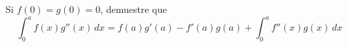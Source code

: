 \item Si $f(0) = g(0) = 0$, demuestre que
    \[ \int_{0}^{a} f(x)g''(x) \, dx = f(a)g'(a) - f'(a)g(a) + \int_{0}^{a} f''(x)g(x) \, dx \]
